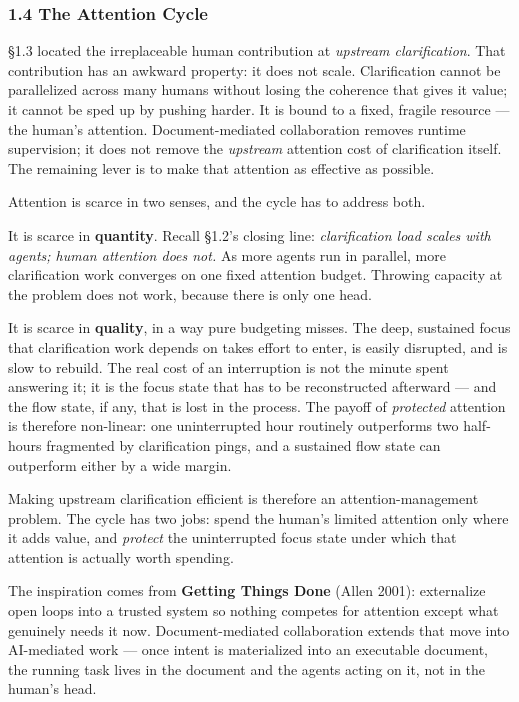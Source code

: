 \documentclass[
  nonatbib,
  preprint]{article}
\begin{document}
\subsubsection{1.4 The Attention Cycle}\label{the-attention-cycle}

§1.3 located the irreplaceable human contribution at \emph{upstream
clarification}. That contribution has an awkward property: it does not
scale. Clarification cannot be parallelized across many humans without
losing the coherence that gives it value; it cannot be sped up by
pushing harder. It is bound to a fixed, fragile resource --- the human's
attention. Document-mediated collaboration removes runtime supervision;
it does not remove the \emph{upstream} attention cost of clarification
itself. The remaining lever is to make that attention as effective as
possible.

Attention is scarce in two senses, and the cycle has to address both.

It is scarce in \textbf{quantity}. Recall §1.2's closing line:
\emph{clarification load scales with agents; human attention does not.}
As more agents run in parallel, more clarification work converges on one
fixed attention budget. Throwing capacity at the problem does not work,
because there is only one head.

It is scarce in \textbf{quality}, in a way pure budgeting misses. The
deep, sustained focus that clarification work depends on takes effort to
enter, is easily disrupted, and is slow to rebuild. The real cost of an
interruption is not the minute spent answering it; it is the focus state
that has to be reconstructed afterward --- and the flow state, if any,
that is lost in the process. The payoff of \emph{protected} attention is
therefore non-linear: one uninterrupted hour routinely outperforms two
half-hours fragmented by clarification pings, and a sustained flow state
can outperform either by a wide margin.

Making upstream clarification efficient is therefore an
attention-management problem. The cycle has two jobs: spend the human's
limited attention only where it adds value, and \emph{protect} the
uninterrupted focus state under which that attention is actually worth
spending.

The inspiration comes from \textbf{Getting Things Done} (Allen 2001):
externalize open loops into a trusted system so nothing competes for
attention except what genuinely needs it now. Document-mediated
collaboration extends that move into AI-mediated work --- once intent is
materialized into an executable document, the running task lives in the
document and the agents acting on it, not in the human's head.
\end{document}
